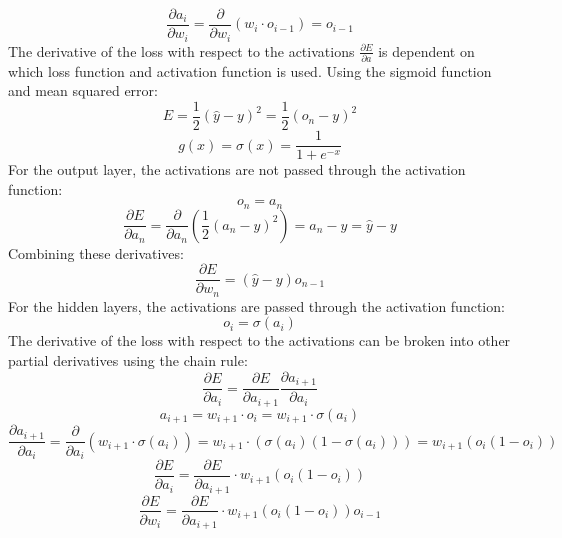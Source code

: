 \documentclass{article}
\begin{document}
\[ \frac{\partial a_i}{\partial w_i} = \frac{\partial}{\partial w_i} (w_i \cdot o_{i-1}) = o_{i-1} \]
The derivative of the loss with respect to the activations $\frac{\partial E}{\partial a}$ is dependent on which loss function and activation function is used. Using the sigmoid function and mean squared error:
\[ E = \frac{1}{2}(\hat{y} - y)^2 = \frac{1}{2}(o_n - y)^2 \]
\[ g(x) = \sigma(x) = \frac{1}{1+e^{-x}} \]
For the output layer, the activations are not passed through the activation function:
\[ o_n = a_n \]
\[ \frac{\partial E}{\partial a_n} = \frac{\partial}{\partial a_n} \left( \frac{1}{2}(a_n - y)^2 \right) = a_n - y = \hat{y} - y \]
Combining these derivatives:
\[ \frac{\partial E}{\partial w_n} = (\hat{y} - y)o_{n-1} \]
For the hidden layers, the activations are passed through the activation function:
\[ o_i = \sigma(a_i) \]
The derivative of the loss with respect to the activations can be broken into other partial derivatives using the chain rule:
\[ \frac{\partial E}{\partial a_i} = \frac{\partial E}{\partial a_{i+1}} \frac{\partial a_{i+1}}{\partial a_i} \]
\[ a_{i+1} = w_{i+1} \cdot o_i = w_{i+1} \cdot \sigma(a_i) \]
\[ \frac{\partial a_{i+1}}{\partial a_i} = \frac{\partial}{\partial a_i} \left( w_{i+1} \cdot \sigma(a_i) \right) = w_{i+1} \cdot \left( \sigma(a_i) \left( 1-\sigma(a_i) \right) \right) = w_{i+1} \left( o_i(1-o_i) \right) \]
\[ \frac{\partial E}{\partial a_i} = \frac{\partial E}{\partial a_{i+1}} \cdot w_{i+1} \left( o_i(1-o_i) \right) \]
\[ \frac{\partial E}{\partial w_i} = \frac{\partial E}{\partial a_{i+1}} \cdot w_{i+1} \left( o_i(1-o_i) \right) o_{i-1} \]
\end{document}

